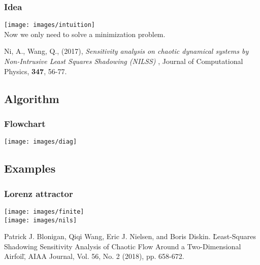 \documentclass{beamer}
\begin{document}
\begin{frame}
  \frametitle{Idea}
  \begin{center}

    \texttt{[image: images/intuition]}\\

    Now we only need to solve a minimization problem.
    \vspace{2cm}

    \tiny{Ni, A., Wang, Q., (2017), \textit{Sensitivity analysis on chaotic dynamical systems by Non-Intrusive Least Squares Shadowing (NILSS)} , Journal of Computational Physics, \textbf{347}, 56-77.}

\end{center}
\end{frame}

\subsection{Algorithm}
\begin{frame}
  \frametitle{Flowchart}
  \begin{center}

    \texttt{[image: images/diag]}\\


\end{center}
\end{frame}


\subsection{Examples}

\begin{frame}
  \frametitle{Lorenz attractor}
  \begin{center}

    \texttt{[image: images/finite]}\\

  \texttt{[image: images/nils]}

\tiny{Patrick J. Blonigan, Qiqi Wang, Eric J. Nielsen, and Boris Diskin.  \"Least-Squares Shadowing Sensitivity Analysis of Chaotic Flow Around a Two-Dimensional Airfoil\", AIAA Journal, Vol. 56, No. 2 (2018), pp. 658-672.}
\end{center}
\end{frame}
\end{document}
